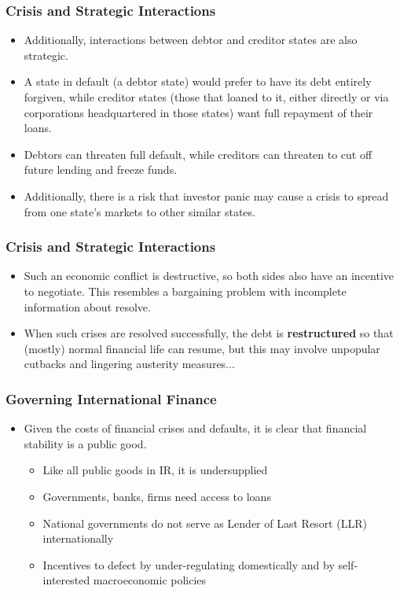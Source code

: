 \documentclass{beamer}
\begin{document}
\begin{frame} 
	\frametitle{\LARGE{Crisis and Strategic Interactions}}
	\begin{itemize}
		\item Additionally, interactions between debtor and creditor states are also strategic. \pause
		\item A state in default (a debtor state) would prefer to have its debt entirely forgiven, while creditor states (those that loaned to it, either directly or via corporations headquartered in those states) want full repayment of their loans. \pause
		\item Debtors can threaten full default, while creditors can threaten to cut off future lending and freeze funds. \pause
		\item Additionally, there is a risk that investor panic may cause a crisis to spread from one state's markets to other similar states.
	\end{itemize}
\end{frame}

\begin{frame} 
	\frametitle{\LARGE{Crisis and Strategic Interactions}}
	\begin{itemize}
		\item Such an economic conflict is destructive, so both sides also have an incentive to negotiate. This resembles a bargaining problem with incomplete information about resolve.
		\item When such crises are resolved successfully, the debt is \textbf{restructured} so that (mostly) normal financial life can resume, but this may involve unpopular cutbacks and lingering austerity measures...
	\end{itemize}
\end{frame}

\begin{frame} 
	\frametitle{\LARGE{Governing International Finance}}
	\begin{itemize}
			\item Given the costs of financial crises and defaults, it is clear that financial stability is a public good. \pause 
			\begin{itemize}
			    \item Like all public goods in IR, it is undersupplied \pause 
                \item Governments, banks, firms need access to loans \pause 
                \item National governments do not serve as Lender of Last Resort (LLR) internationally \pause 
                \item Incentives to defect by under-regulating domestically and by self-interested macroeconomic policies  
			\end{itemize}
	\end{itemize}
\end{frame}
\end{document}
